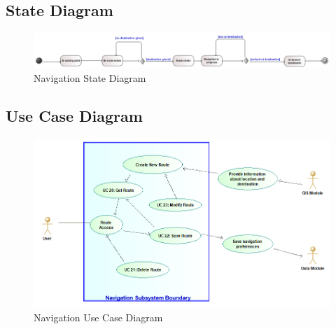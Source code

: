 	\subsection{State Diagram}
	\begin{figure}[H]
	\includegraphics[width=\linewidth]{Navigation/NavigationModuleStateDiagram.png}
	\caption{Navigation State Diagram}
	\label{fig:UML3}
	\end{figure}
	
	\subsection{Use Case Diagram}
	\begin{figure}[H]
	\includegraphics[width=\linewidth]{Navigation/NavigationModuleUseCaseDiagram.png}
	\caption{Navigation Use Case Diagram}
	\label{fig:UML4}
	\end{figure}
	
	


	
	
	

